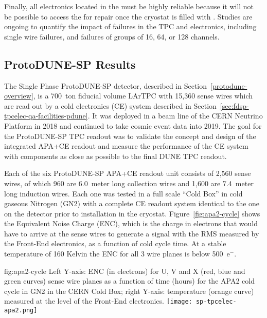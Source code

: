 Finally, all electronics located in the \lar must 
be highly reliable because it will not be possible to access the  for repair once the cryostat is filled with \lar. Studies are ongoing to quantify the impact of failures in the TPC and electronics, including single wire failures, and failures of groups of \num{16}, \num{64}, or \num{128} channels.

\subsection{ProtoDUNE-SP Results}
\label{sec:fdsp-tpcelec-overview-pdune}


The Single Phase ProtoDUNE-SP detector, described in Section~\ref{protodune-overview}, is a 700~ton fiducial volume LArTPC with 15,360 sense wires which are read out by a cold electronics (CE) system described in Section~\ref{sec:fdsp-tpcelec-qa-facilities-pdune}. It was deployed in a beam line of the CERN Neutrino Platform in 2018 and continued to take cosmic event data into 2019. The goal for the ProtoDUNE-SP TPC readout was to validate the concept and design of the integrated APA+CE readout and measure the performance of the CE system with components as close as possible to the final DUNE TPC readout.

Each of the six ProtoDUNE-SP APA+CE readout unit consists of 2,560 sense wires, of which 960 are 6.0~meter long collection wires and 1,600 are 7.4~meter long induction wires. Each one was tested in a full scale ``Cold Box'' in cold gaseous Nitrogen (GN2) with a complete CE readout system identical to the one on the detector prior to installation in the cryostat. Figure~\ref{fig:apa2-cycle} shows the Equivalent Noise Charge (ENC), which is the charge in electrons that would have to arrive at the sense wires to generate a signal with the RMS measured by the Front-End electronics, as a function of cold cycle time. At a stable temperature of 160 Kelvin the ENC for all 3 wire planes is below 500~e$^-$.

\begin{dunefigure}
{fig:apa2-cycle}
{Left Y-axis: ENC (in electrons) for U, V and X (red, blue and green curves) sense wire planes as a function of time (hours) for the APA2 cold cycle in GN2 in the CERN Cold Box; right Y-axis: temperature (orange curve) measured at the level of the Front-End electronics.}
\texttt{[image: sp-tpcelec-apa2.png]}
\end{dunefigure}

